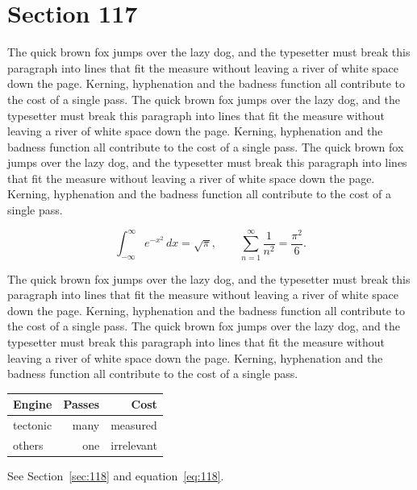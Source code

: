 \documentclass{article}
\begin{document}
\section{Section 117}
\label{sec:117}
The quick brown fox jumps over the lazy dog, and the typesetter must break this paragraph into lines that fit the measure without leaving a river of white space down the page. Kerning, hyphenation and the badness function all contribute to the cost of a single pass. The quick brown fox jumps over the lazy dog, and the typesetter must break this paragraph into lines that fit the measure without leaving a river of white space down the page. Kerning, hyphenation and the badness function all contribute to the cost of a single pass. The quick brown fox jumps over the lazy dog, and the typesetter must break this paragraph into lines that fit the measure without leaving a river of white space down the page. Kerning, hyphenation and the badness function all contribute to the cost of a single pass. 

\begin{equation}\label{eq:117}
\int_{-\infty}^{\infty} e^{-x^{2}}\,dx = \sqrt{\pi}, \qquad
\sum_{n=1}^{\infty} \frac{1}{n^{2}} = \frac{\pi^{2}}{6}.
\end{equation}

The quick brown fox jumps over the lazy dog, and the typesetter must break this paragraph into lines that fit the measure without leaving a river of white space down the page. Kerning, hyphenation and the badness function all contribute to the cost of a single pass. The quick brown fox jumps over the lazy dog, and the typesetter must break this paragraph into lines that fit the measure without leaving a river of white space down the page. Kerning, hyphenation and the badness function all contribute to the cost of a single pass. 

\begin{center}
\begin{tabular}{lrr}
\toprule
Engine & Passes & Cost \\
\midrule
tectonic & many & measured \\
others & one & irrelevant \\
\bottomrule
\end{tabular}
\end{center}

See Section~\ref{sec:118} and equation~\eqref{eq:118}.
\end{document}
